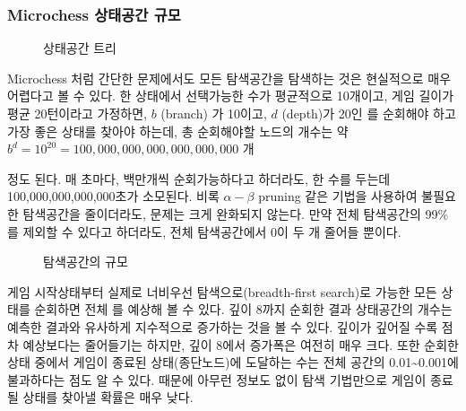 \documentclass[letterpaper,10pt,english]{sphinxmanual}
\begin{document}
\subsubsection{Microchess 상태공간 규모}
\label{\detokenize{03-basic_ai_examples:microchess}}
\begin{figure}[htbp]
\centering
\capstart

\noindent{}
\caption{상태공간 트리}\label{\detokenize{03-basic_ai_examples:state-state-tree}}\label{\detokenize{03-basic_ai_examples:id36}}\end{figure}

Microchess 처럼 간단한 문제에서도 모든 탐색공간을 탐색하는 것은 현실적으로 매우 어렵다고 볼 수 있다.
한 상태에서 선택가능한 수가 평균적으로 10개이고, 게임 길이가 평균 20턴이라고 가정하면, \(b\) (branch) 가 10이고,
\(d\) (depth)가 20인 {\hyperref[\detokenize{03-basic_ai_examples:state-state-tree}]{}} 를 순회해야 하고 가장 좋은 상태를 찾아야 하는데, 총 순회해야할 노드의 개수는
약 \(b^d = 10^{20} = 100,000,000,000,000,000,000\) 개 %
\begin{footnote}[6]\sphinxAtStartFootnote
{}
%
\end{footnote} 정도 된다. 매 초마다, 백만개씩 순회가능하다고 하더라도,
한 수를 두는데 100,000,000,000,000초가 소모된다.
비록 \(\alpha-\beta\) pruning 같은 기법을 사용하여 불필요한 탐색공간을 줄이더라도, 문제는 크게 완화되지 않는다.
만약 전체 탐색공간의 99\%를 제외할 수 있다고 하더라도, 전체 탐색공간에서 0이 두 개 줄어들 뿐이다.

\begin{figure}[htbp]
\centering
\capstart

\noindent{}
\caption{탐색공간의 규모}\label{\detokenize{03-basic_ai_examples:search-space-scale}}\label{\detokenize{03-basic_ai_examples:id37}}\end{figure}

게임 시작상태부터 실제로 너비우선 탐색으로(breadth-first search)로 가능한 모든 상태를 순회하면
전체 {\hyperref[\detokenize{03-basic_ai_examples:search-space-scale}]{}} 를 예상해 볼 수 있다.
깊이 8까지 순회한 결과 상태공간의 개수는 예측한 결과와 유사하게 지수적으로 증가하는 것을 볼 수 있다.
깊이가 깊어질 수록 점차 예상보다는 줄어들기는 하지만, 깊이 8에서 증가폭은 여전히 매우 크다.
또한 순회한 상태 중에서 게임이 종료된 상태(종단노드)에 도달하는 수는 전체 공간의 0.01\textasciitilde{}0.001에 불과하다는 점도 알 수 있다.
때문에 아무런 정보도 없이 탐색 기법만으로 게임이 종료될 상태를 찾아낼 확률은 매우 낮다.
\end{document}
